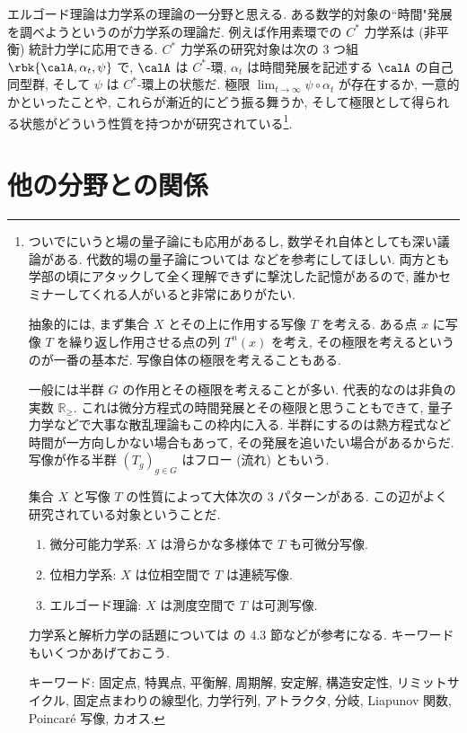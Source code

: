\documentclass[openany, a4paper, oneside]{jsbook}
\begin{document}
エルゴード理論は力学系の理論の一分野と思える.
ある数学的対象の``時間"発展を調べようというのが力学系の理論だ.
例えば作用素環での $C^*$ 力学系は (非平衡) 統計力学に応用できる.
$C^*$ 力学系の研究対象は次の 3 つ組 $\rbk{\calA, \alpha_t, \psi}$ で,
$\calA$ は $C^*$-環, $\alpha_t$ は時間発展を記述する $\calA$ の自己同型群,
そして $\psi$ は $C^*$-環上の状態だ.
極限 $\lim_{t \to \infty} \psi \circ \alpha_t$ が存在するか, 一意的かといったことや,
これらが漸近的にどう振る舞うか, そして極限として得られる状態がどういう性質を持つかが研究されている\footnote{ついでにいうと場の量子論にも応用があるし, 数学それ自体としても深い議論がある.
代数的場の量子論については \cite{HansJurgenBorchers1, HansJurgenBorchers2} などを参考にしてほしい.
両方とも学部の頃にアタックして全く理解できずに撃沈した記憶があるので,
誰かセミナーしてくれる人がいると非常にありがたい.

抽象的には, まず集合 $X$ とその上に作用する写像 $T$ を考える.
ある点 $x$ に写像 $T$ を繰り返し作用させる点の列 $T^n (x)$ を考え,
その極限を考えるというのが一番の基本だ.
写像自体の極限を考えることもある.

一般には半群 $G$ の作用とその極限を考えることが多い.
代表的なのは非負の実数 $\mathbb{R}_{\geq}$.
これは微分方程式の時間発展とその極限と思うこともできて,
量子力学などで大事な散乱理論もこの枠内に入る.
半群にするのは熱方程式など時間が一方向しかない場合もあって,
その発展を追いたい場合があるからだ.
写像が作る半群 $(T_g)_{g \in G}$ はフロー (流れ) ともいう.

集合 $X$ と写像 $T$ の性質によって大体次の 3 パターンがある.
この辺がよく研究されている対象ということだ.
\begin{enumerate}
\item 微分可能力学系: $X$ は滑らかな多様体で $T$ も可微分写像.
\item 位相力学系: $X$ は位相空間で $T$ は連続写像.
\item エルゴード理論: $X$ は測度空間で $T$ は可測写像.
\end{enumerate}
力学系と解析力学の話題については \cite{NakamuraYamamoto1, NakamuraYamamoto2} の 4.3 節などが参考になる.
キーワードもいくつかあげておこう.

キーワード: 固定点, 特異点, 平衡解, 周期解, 安定解, 構造安定性, リミットサイクル,
固定点まわりの線型化, 力学行列, アトラクタ, 分岐, Liapunov 関数, Poincar\'e 写像, カオス.}.
\section{他の分野との関係}
\end{document}
